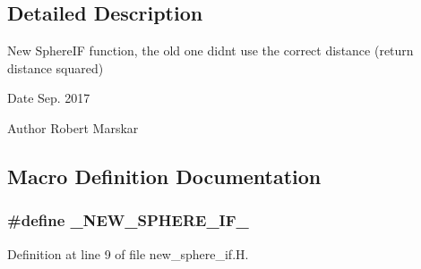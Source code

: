\subsection{Detailed Description}
New Sphere\+IF function, the old one didn\textquotesingle{}t use the correct distance (return distance squared) 

\begin{DoxyDate}{Date}
Sep. 2017 
\end{DoxyDate}
\begin{DoxyAuthor}{Author}
Robert Marskar 
\end{DoxyAuthor}


\subsection{Macro Definition Documentation}
\subsubsection[{\texorpdfstring{\+\_\+\+N\+E\+W\+\_\+\+S\+P\+H\+E\+R\+E\+\_\+\+I\+F\+\_\+}{_NEW_SPHERE_IF_}}]{\setlength{\rightskip}{0pt plus 5cm}\#define \+\_\+\+N\+E\+W\+\_\+\+S\+P\+H\+E\+R\+E\+\_\+\+I\+F\+\_\+}\hypertarget{new__sphere__if_8H_ac7a24fb7b28f7a2bbe5441566aa607f0}{}\label{new__sphere__if_8H_ac7a24fb7b28f7a2bbe5441566aa607f0}


Definition at line 9 of file new\+\_\+sphere\+\_\+if.\+H.

